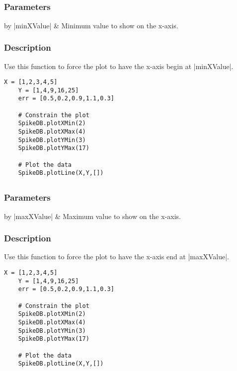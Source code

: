 \documentclass{report}
\begin{document}
\clearpage
\subsection{}
\subsubsection{Parameters}
\begin{table}[h]
\begin{center}
\begin{tabular}{by}
		|minXValue| & Minimum value to show on the x-axis.\\
	\end{tabular}
\end{center}
\end{table}
\subsubsection{Description}
Use this function to force the plot to have the x-axis begin at |minXValue|.
\begin{lstlisting}[caption=Example]
	X = [1,2,3,4,5]
	Y = [1,4,9,16,25]
	err = [0.5,0.2,0.9,1.1,0.3]

	# Constrain the plot
	SpikeDB.plotXMin(2)
	SpikeDB.plotXMax(4)
	SpikeDB.plotYMin(3)
	SpikeDB.plotYMax(17)

	# Plot the data
	SpikeDB.plotLine(X,Y,[])
\end{lstlisting}

\clearpage
\subsection{}
\subsubsection{Parameters}
\begin{table}[h]
\begin{center}
\begin{tabular}{by}
		|maxXValue| & Maximum value to show on the x-axis.\\
	\end{tabular}
\end{center}
\end{table}
\subsubsection{Description}
Use this function to force the plot to have the x-axis end at |maxXValue|.
\begin{lstlisting}[caption=Example]
	X = [1,2,3,4,5]
	Y = [1,4,9,16,25]
	err = [0.5,0.2,0.9,1.1,0.3]

	# Constrain the plot
	SpikeDB.plotXMin(2)
	SpikeDB.plotXMax(4)
	SpikeDB.plotYMin(3)
	SpikeDB.plotYMax(17)

	# Plot the data
	SpikeDB.plotLine(X,Y,[])
\end{lstlisting}
\end{document}
